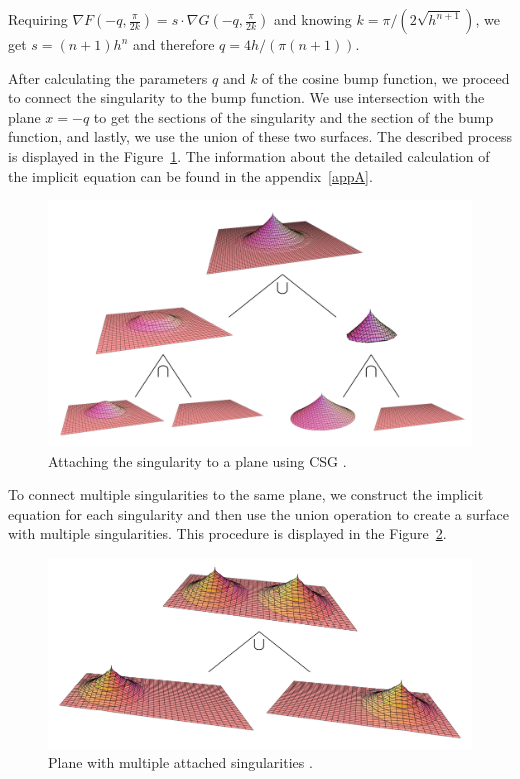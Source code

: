 Requiring $\nabla F (-q, \frac{\pi}{2k}) = s \cdot \nabla G (-q, \frac{\pi}{2k})$
and knowing $k=\pi/(2\sqrt{h^{n+1}})$, we get $s=(n+1)h^n$ and therefore $q=4h/(\pi(n+1))$.

After calculating the parameters $q$ and $k$ of the cosine bump function, 
we proceed to connect the singularity to the bump function.
We use intersection with the plane $x=-q$ to get the sections of the singularity
and the section of the bump function, and lastly, we use the union of these two 
surfaces. The described process is displayed in the Figure~\ref{img:26}.
The information about the detailed calculation of the implicit equation 
can be found in the appendix~\ref{appA}.

\begin{figure}
    \centerline{\includegraphics[scale=0.5]{images/img26}}
    \caption[Attaching the singularity to a plane using CSG]
    {Attaching the singularity to a plane using CSG \cite{calcplot3d}.}
    \label{img:26}
\end{figure}

To connect multiple singularities to the same plane, we construct the implicit
equation for each singularity and then use the union operation to
create a surface with multiple singularities. This procedure is displayed in
the Figure~\ref{img:28}.

\begin{figure}
    \centerline{\includegraphics[scale=0.5]{images/img28}}
    \caption[Plane with multiple attached singularities]
    {Plane with multiple attached singularities \cite{calcplot3d}.}
    \label{img:28}
\end{figure}

